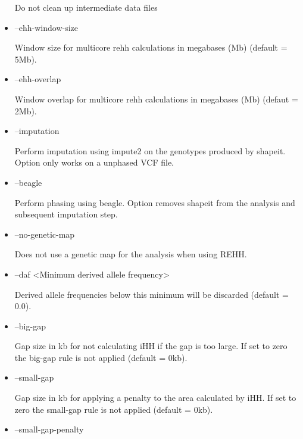 \documentclass[a4paper,10pt]{article}
\begin{document}
\begin{itemize}
                             Do not clean up intermediate data files

                             \item --ehh-window-size

                             Window size for multicore rehh calculations in megabases (Mb) (default = 5Mb). 

                             \item --ehh-overlap

                             Window overlap for multicore rehh calculations in megabases (Mb) (defaut = 2Mb).

                             \item --imputation

                             Perform imputation using impute2 on the genotypes produced by shapeit. Option only works on a unphased VCF file.

                             \item --beagle

                             Perform phasing using beagle. Option removes shapeit from the analysis and subsequent imputation step.

                             \item --no-genetic-map 

                             Does not use a genetic map for the analysis when using REHH.


                             \item --daf <Minimum derived allele frequency>

                             Derived allele frequencies below this minimum will be discarded (default = 0.0).

                             \item --big-gap

                             Gap size in kb for not calculating iHH if the gap is too large. If set
                             to zero the big-gap rule is not applied (default = 0kb).

                             \item --small-gap

                             Gap size in kb for applying a penalty to the area calculated by
                             iHH. If set to zero the small-gap rule is not applied (default = 0kb).

                             \item --small-gap-penalty


\end{itemize}
\end{document}
